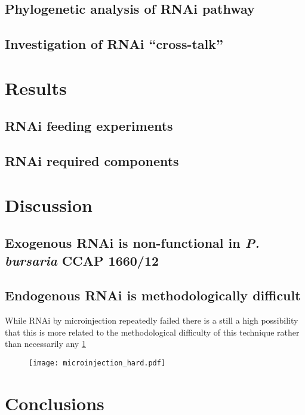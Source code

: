 \subsection{Phylogenetic analysis of RNAi pathway}


\subsection{Investigation of RNAi ``cross-talk''}


\section{Results}

\subsection{RNAi feeding experiments}




\subsection{RNAi required components}



\section{Discussion}

\subsection{Exogenous RNAi is non-functional in \textit{P. bursaria} CCAP 1660/12}



\subsection{Endogenous RNAi is methodologically difficult}


While RNAi by microinjection repeatedly failed there is a still a high possibility
that this is more related to the methodological difficulty of this technique rather than
necessarily any 
\cref{fig:microinjection_nucleus}

\begin{figure}
    \texttt{[image: microinjection\_hard.pdf]}
    \caption{}
    \label{fig:microinjection_nucleus}
\end{figure}






\section{Conclusions}

